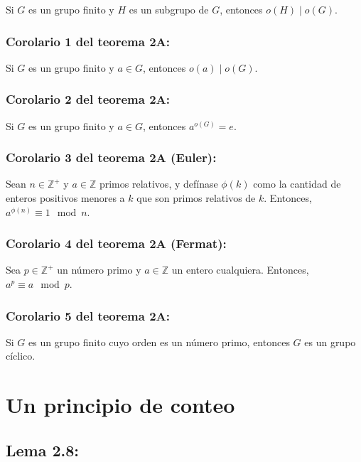 \documentclass{article}
\begin{document}
Si $G$ es un grupo finito y $H$ es un subgrupo de $G$, entonces $o(H)\mid o(G)$.

\subsubsection*{\color{red} Corolario 1 del teorema 2A:}

Si $G$ es un grupo finito y $a\in G$, entonces $o(a)\mid o(G)$.

\subsubsection*{\color{red} Corolario 2 del teorema 2A:}

Si $G$ es un grupo finito y $a\in G$, entonces $a^{o(G)}=e$.

\subsubsection*{\color{red} Corolario 3 del teorema 2A (Euler):}

Sean $n\in\mathbb{Z}^+$ y $a\in\mathbb{Z}$ primos relativos, y defínase $\phi(k)$ como la cantidad de enteros positivos menores a $k$ que son primos relativos de $k$. Entonces, $a^{\phi(n)}\equiv 1\mod n$.

\subsubsection*{\color{red} Corolario 4 del teorema 2A (Fermat):}

Sea $p\in\mathbb{Z}^+$ un número primo y $a\in\mathbb{Z}$ un entero cualquiera. Entonces, $a^p\equiv a\mod p$.

\subsubsection*{\color{red} Corolario 5 del teorema 2A:}

Si $G$ es un grupo finito cuyo orden es un número primo, entonces $G$ es un grupo cíclico.

\newpage
\section{Un principio de conteo} 

\subsection*{\color{blue} Lema 2.8:}
\end{document}
